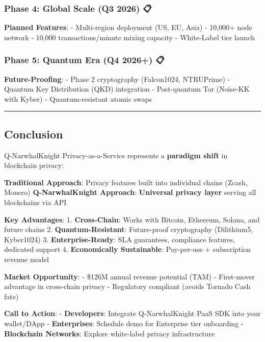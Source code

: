 \documentclass[
  11pt,
]{article}
\begin{document}
\hypertarget{phase-4-global-scale-q3-2026}{%
\subsubsection{Phase 4: Global Scale (Q3 2026)
📋}\label{phase-4-global-scale-q3-2026}}

\textbf{Planned Features}: - Multi-region deployment (US, EU, Asia) -
10,000+ node network - 10,000 transactions/minute mixing capacity -
White-Label tier launch

\hypertarget{phase-5-quantum-era-q4-2026}{%
\subsubsection{Phase 5: Quantum Era (Q4 2026+)
📋}\label{phase-5-quantum-era-q4-2026}}

\textbf{Future-Proofing}: - Phase 2 cryptography (Falcon1024, NTRUPrime)
- Quantum Key Distribution (QKD) integration - Post-quantum Tor
(Noise-KK with Kyber) - Quantum-resistant atomic swaps

\begin{center}\rule{0.5\linewidth}{0.5pt}\end{center}

\hypertarget{conclusion}{%
\subsection{Conclusion}\label{conclusion}}

Q-NarwhalKnight Privacy-as-a-Service represents a \textbf{paradigm
shift} in blockchain privacy:

\textbf{Traditional Approach}: Privacy features built into individual
chains (Zcash, Monero) \textbf{Q-NarwhalKnight Approach}:
\textbf{Universal privacy layer} serving all blockchains via API

\textbf{Key Advantages}: 1. \textbf{Cross-Chain}: Works with Bitcoin,
Ethereum, Solana, and future chains 2. \textbf{Quantum-Resistant}:
Future-proof cryptography (Dilithium5, Kyber1024) 3.
\textbf{Enterprise-Ready}: SLA guarantees, compliance features,
dedicated support 4. \textbf{Economically Sustainable}: Pay-per-use +
subscription revenue model

\textbf{Market Opportunity}: - \$126M annual revenue potential (TAM) -
First-mover advantage in cross-chain privacy - Regulatory compliant
(avoids Tornado Cash fate)

\textbf{Call to Action}: - \textbf{Developers}: Integrate
Q-NarwhalKnight PaaS SDK into your wallet/DApp - \textbf{Enterprises}:
Schedule demo for Enterprise tier onboarding - \textbf{Blockchain
Networks}: Explore white-label privacy infrastructure
\end{document}
